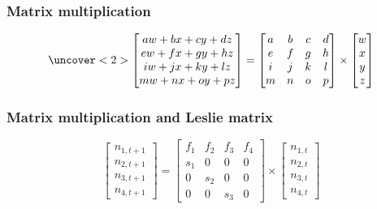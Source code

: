 \documentclass[color=usenames,dvipsnames]{beamer}\usepackage[]{graphicx}\usepackage[]{color}
\begin{document}
\begin{frame}
  \frametitle{Matrix multiplication}
  \Large
  \begin{center}
    \[
    \uncover<2>{ %
    \begin{bmatrix}
      aw + bx + cy + dz \\
      ew + fx + gy + hz \\
      iw + jx + ky + lz \\
      mw + nx + oy + pz
    \end{bmatrix}
    } =
    \begin{bmatrix}
      a & b & c & d \\
      e & f & g & h \\
      i & j & k & l \\
      m & n & o & p
    \end{bmatrix}
    \times
    \begin{bmatrix}
      w \\
      x \\
      y \\
      z
    \end{bmatrix}
    \]
  \end{center}
\end{frame}






\begin{frame}
  \frametitle{Matrix multiplication and Leslie matrix}
  \Large
  \begin{center}
    \[
    \begin{bmatrix}
      n_{1,t+1} \\
      n_{2,t+1} \\
      n_{3,t+1} \\
      n_{4,t+1}
    \end{bmatrix}
    =
    \begin{bmatrix}
      f_1 & f_2 & f_3 & f_4 \\
      s_1 & 0 & 0 & 0 \\
      0 & s_2 & 0 & 0 \\
      0 & 0 & s_3 & 0
    \end{bmatrix}
    \times
    \begin{bmatrix}
      n_{1,t} \\
      n_{2,t} \\
      n_{3,t} \\
      n_{4,t}
    \end{bmatrix}
    \]
  \end{center}
\end{frame}
\end{document}
